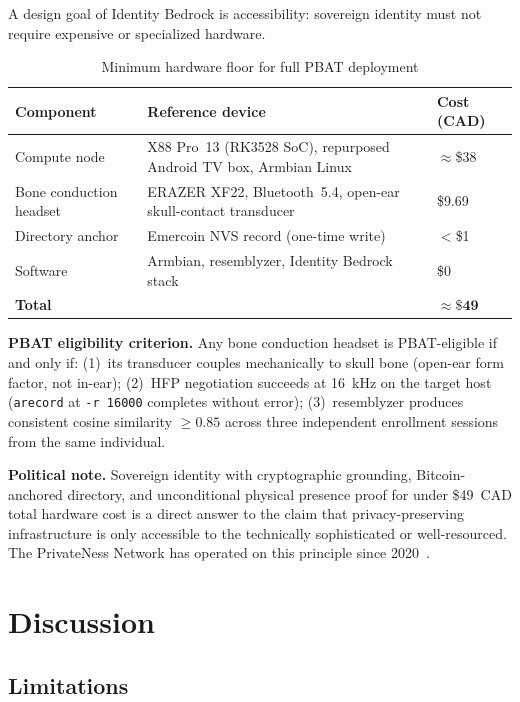 \documentclass[12pt,a4paper]{article}
\begin{document}
A design goal of Identity Bedrock is accessibility: sovereign identity
must not require expensive or specialized hardware.

\begin{table}[H]
\caption{Minimum hardware floor for full PBAT deployment}
\label{tab:hardware}
\small\renewcommand{\arraystretch}{1.3}
\begin{tabular}{P{3.2cm}P{4.2cm}P{2.2cm}}
\toprule
\textbf{Component} & \textbf{Reference device} & \textbf{Cost (CAD)}\\
\midrule
Compute node &
  X88 Pro~13 (RK3528 SoC), repurposed Android TV box, Armbian Linux &
  $\approx$\$38\\
Bone conduction headset &
  ERAZER XF22, Bluetooth~5.4, open-ear skull-contact transducer &
  \$9.69\\
Directory anchor &
  Emercoin NVS record (one-time write) &
  $<$\$1\\
Software &
  Armbian, resemblyzer, Identity Bedrock stack &
  \$0\\
\midrule
\textbf{Total} & & $\mathbf{\approx\$49}$\\
\bottomrule
\end{tabular}
\end{table}

\textbf{PBAT eligibility criterion.} Any bone conduction headset is
PBAT-eligible if and only if: (1)~its transducer couples mechanically to
skull bone (open-ear form factor, not in-ear); (2)~HFP negotiation
succeeds at 16~kHz on the target host (\texttt{arecord} at
\texttt{-r~16000} completes without error); (3)~resemblyzer produces
consistent cosine similarity $\geq 0.85$ across three independent
enrollment sessions from the same individual.

\textbf{Political note.} Sovereign identity with cryptographic grounding,
Bitcoin-anchored directory, and unconditional physical presence proof for
under \$49~CAD total hardware cost is a direct answer to the claim that
privacy-preserving infrastructure is only accessible to the technically
sophisticated or well-resourced. The PrivateNess Network has operated on
this principle since 2020~\cite{Litepaper20}.

\section{Discussion}
\label{sec:discussion}

\subsection{Limitations}
\label{sec:limitations}
\end{document}

